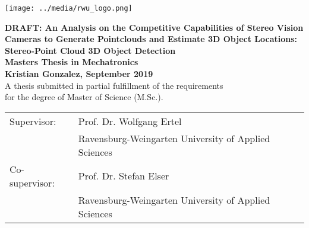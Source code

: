 \pagestyle{empty}
\begin{flushright}
\texttt{[image: ../media/rwu\_logo.png]}
\end{flushright}

\begin{center}
\vspace*{2cm}

\LARGE
\textbf{DRAFT: An Analysis on the Competitive Capabilities of Stereo Vision Cameras to Generate Pointclouds and Estimate 3D Object Locations: Stereo-Point Cloud 3D Object Detection}\\
\Large
\vspace*{2cm}
\noindent \textbf{Masters Thesis in Mechatronics}\\
\vspace*{0.5cm}
\noindent \textbf{Kristian Gonzalez, September 2019}\\
\vspace*{2cm}
\normalsize
A thesis submitted in partial fulfillment of the requirements\\ for the degree
of Master of Science (M.Sc.).

\end{center}

\vspace*{4.5cm}
\begin{tabular}{ll}
Supervisor: & Prof. Dr. Wolfgang Ertel \\
 & Ravensburg-Weingarten University of Applied Sciences\\
Co-supervisor: & Prof. Dr. Stefan Elser\\
 & Ravensburg-Weingarten University of Applied Sciences\\
\end{tabular}
